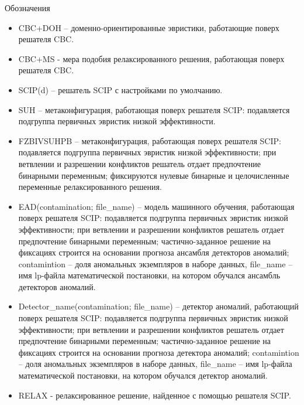 \documentclass[%
	11pt,
	a4paper,
	utf8,
		]{article}
\begin{document}
{Обозначения}
\begin{itemize}
	\item CBC+DOH – доменно-ориентированные эвристики, работающие поверх решателя CBC.
	
    \item CBC+MS - мера подобия релаксированного решения, работающая поверх решателя CBC.
    
    \item SCIP(d) – решатель SCIP с настройками по умолчанию.
    
    \item SUH – метаконфигурация, работающая поверх решателя SCIP: подавляется подгруппа первичных эвристик низкой эффективности.
    
    \item FZBIVSUHPB – метаконфигурация, работающая поверх решателя SCIP: подавляется подгруппа первичных эвристик низкой эффективности; при ветвлении и разрешении конфликтов решатель отдает предпочтение бинарными переменным; фиксируются нулевые бинарные и целочисленные переменные релаксированного решения.
    
    \item {EAD(contamination; file\_name)} – модель машинного обучения, работающая поверх решателя SCIP: подавляется подгруппа первичных эвристик низкой эффективности; при ветвлении и разрешении конфликтов решатель отдает предпочтение бинарными переменным; частично-заданное решение на фиксациях строится на основании прогноза ансамбля детекторов аномалий; {contamintion} – доля аномальных экземпляров в наборе данных, {file\_name} – имя lp-файла математической постановки, на котором обучался ансамбль детекторов аномалий.
    
    \item Detector\_name(contamination; file\_name) – детектор аномалий, работающий поверх решателя SCIP: подавляется подгруппа первичных эвристик низкой эффективности; при ветвлении и разрешении конфликтов решатель отдает предпочтение бинарными переменным; частично-заданное решение на фиксациях строится на основании прогноза детектора аномалий; contamintion – доля аномальных экземпляров в наборе данных, file\_name – имя lp-файла математической постановки, на котором обучался детектор аномалий.
    
    \item RELAX - релаксированное решение, найденное с помощью решателя SCIP.
\end{itemize}
\end{document}
